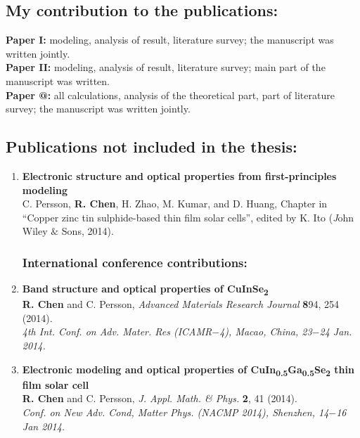 \documentclass[a4paper, 12pt, titlepage,oneside,drop]{kthesis}
\makeatletter
\newcommand{\Rmnum}[1]{\expandafter\@slowromancap\romannumeral #1@}
\makeatother
\begin{document}
\subsection*{My contribution to the publications:}

\textbf{Paper I:} modeling, analysis of result, literature survey;
the manuscript was written jointly.\\
\textbf{Paper II:} modeling, analysis of result, literature survey; main part of the manuscript was written.\\
\textbf{Paper \Rmnum{3}:} all calculations, analysis of the theoretical part, part of literature survey;
the manuscript was written jointly.\\

\subsection*{Publications not included in the thesis:}
\begin{enumerate}
\renewcommand{\labelenumi}{\Roman{enumi}}
\setcounter{enumi}{3}

\subsubsection*{Book chapter:}
\item{}\textbf{Electronic structure and optical properties from first-principles modeling} \\
C. Persson, \textbf{R. Chen}, H. Zhao, M. Kumar, and D. Huang, Chapter in “Copper zinc tin sulphide-based thin film solar cells”,
edited by K. Ito ({\textit John Wiley $\&$ Sons}, 2014).



\subsubsection*{International conference contributions:}
\renewcommand{\labelenumi}{\Roman{enumi}}
\setcounter{enumi}{4}

\item{} \textbf{Band structure and optical properties of CuInSe\textsubscript{2}}
\\ \textbf{R. Chen} and C. Persson, 
\textit{Advanced Materials Research Journal} {\textbf 894}, 254 (2014). \\
\textit{4th Int. Conf. on Adv. Mater. Res (ICAMR$-$4), Macao, China, 23$-$24 Jan. 2014.}


\item{} \textbf{Electronic modeling and optical properties of CuIn\textsubscript{0.5}Ga\textsubscript{0.5}Se\textsubscript{2} thin film solar cell}
\\ \textbf{R. Chen} and C. Persson,
\textit{J. Appl. Math. \& Phys.} {\textbf 2}, 41 (2014). \\
\textit{Conf. on New Adv. Cond, Matter Phys. (NACMP 2014), Shenzhen, 14$-$16 Jan 2014.}

\end{enumerate}
\end{document}

